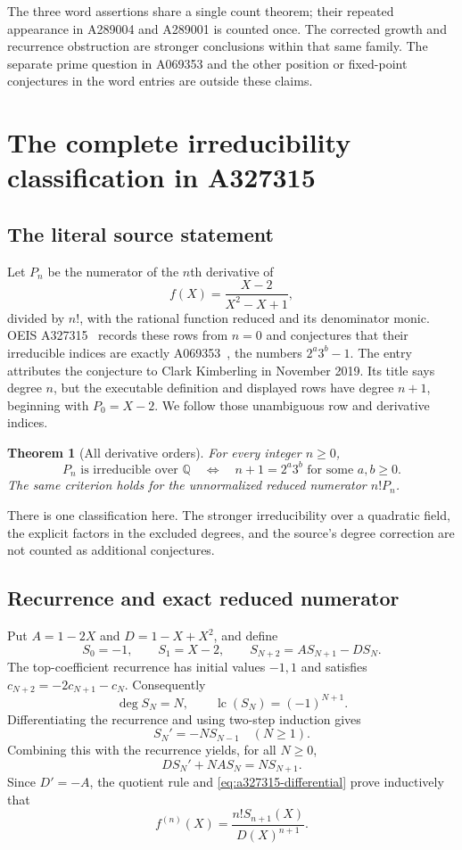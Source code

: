 \documentclass[11pt]{article}
\newtheorem{theorem}{Theorem}[section]
\begin{document}
The three word assertions share a single count theorem; their repeated
appearance in A289004 and A289001 is counted once.  The corrected growth
and recurrence obstruction are stronger conclusions within that same
family.  The separate prime question in A069353 and the other position
or fixed-point conjectures in the word entries are outside these claims.

\section{The complete irreducibility classification in A327315}
\label{sec:a327315}

\subsection{The literal source statement}

Let $P_n$ be the numerator of the $n$th derivative of
\[
 f(X)=\frac{X-2}{X^2-X+1},
\]
divided by $n!$, with the rational function reduced and its denominator
monic.  OEIS A327315~\cite{A327315} records these rows from $n=0$ and conjectures that
their irreducible indices are exactly A069353~\cite{A069353}, the numbers $2^a3^b-1$.
The entry attributes the conjecture to Clark Kimberling in November 2019.
Its title says degree $n$, but the executable definition and displayed
rows have degree $n+1$, beginning with $P_0=X-2$.  We follow those
unambiguous row and derivative indices.

\begin{theorem}[All derivative orders]
\label{thm:a327315}
For every integer $n\ge0$,
\[
 P_n\text{ is irreducible over }\mathbb Q
 \quad\Longleftrightarrow\quad
 n+1=2^a3^b\text{ for some }a,b\ge0.
\]
The same criterion holds for the unnormalized reduced numerator $n!P_n$.
\end{theorem}

There is one classification here.  The stronger irreducibility over a
quadratic field, the explicit factors in the excluded degrees, and the
source's degree correction are not counted as additional conjectures.

\subsection{Recurrence and exact reduced numerator}

Put $A=1-2X$ and $D=1-X+X^2$, and define
\[
 S_0=-1,\qquad S_1=X-2,\qquad
 S_{N+2}=A S_{N+1}-D S_N.
\]
The top-coefficient recurrence has initial values $-1,1$ and satisfies
$c_{N+2}=-2c_{N+1}-c_N$.  Consequently
\[
 \deg S_N=N,\qquad \operatorname{lc}(S_N)=(-1)^{N+1}.
\]
Differentiating the recurrence and using two-step induction gives
\[
 S_N'=-N S_{N-1}\quad(N\ge1).
\]
Combining this with the recurrence yields, for all $N\ge0$,
\begin{equation}
\label{eq:a327315-differential}
 D S_N'+N A S_N=N S_{N+1}.
\end{equation}
Since $D'=-A$, the quotient rule and
\eqref{eq:a327315-differential} prove inductively that
\begin{equation}
\label{eq:a327315-derivative}
 f^{(n)}(X)=\frac{n!S_{n+1}(X)}{D(X)^{n+1}}.
\end{equation}
\end{document}
